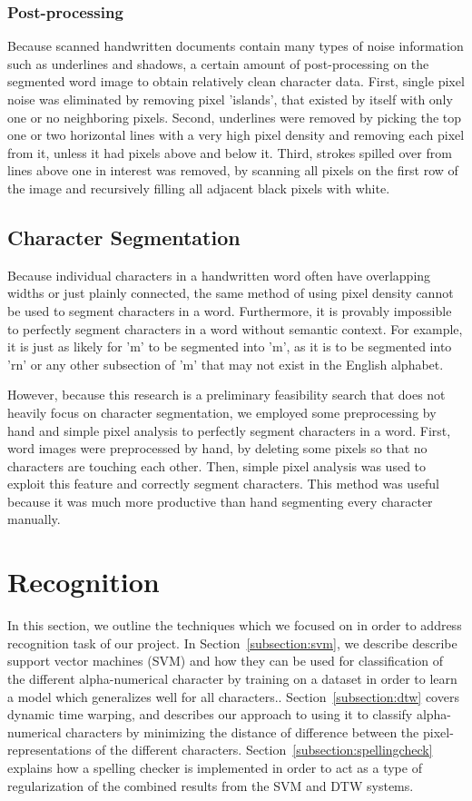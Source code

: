 \documentclass[12pt]{article}
\begin{document}
		\subsubsection{Post-processing}
		Because scanned handwritten documents contain many types of noise information such as underlines and shadows, a certain amount of post-processing on the segmented word image to obtain relatively clean character data. First, single pixel noise was eliminated by removing pixel 'islands', that existed by itself with only one or no neighboring pixels. Second, underlines were removed by picking the top one or two horizontal lines with a very high pixel density and removing each pixel from it, unless it had pixels above and below it. Third, strokes spilled over from lines above one in interest was removed, by scanning all pixels on the first row of the image and recursively filling all adjacent black pixels with white.
		

	\subsection{Character Segmentation}
		Because individual characters in a handwritten word often have overlapping widths or just plainly connected, the same method of using pixel density cannot be used to segment characters in a word. Furthermore, it is provably impossible to perfectly segment characters in a word without semantic context. For example, it is just as likely for 'm' to be segmented into 'm', as it is to be segmented into 'rn' or any other subsection of 'm' that may not exist in the English alphabet.
		
		However, because this research is a preliminary feasibility search that does not heavily focus on character segmentation, we employed some preprocessing by hand and simple pixel analysis to perfectly segment characters in a word. First, word images were preprocessed by hand, by deleting some pixels so that no characters are touching each other. Then, simple pixel analysis was used to exploit this feature and correctly segment characters. This method was useful because it was much more productive than hand segmenting every character manually.

			
\section{Recognition}
\label{section:recognition}
	In this section, we outline the techniques which we focused on in order to address recognition task of our project. In Section~\ref{subsection:svm}, we describe describe support vector machines (SVM) and how they can be used for classification of the different alpha-numerical character by training on a dataset in order to learn a model which generalizes well for all characters.. Section~\ref{subsection:dtw} covers dynamic time warping, and describes our approach to using it to classify alpha-numerical characters by minimizing the distance of difference between the pixel-representations of the different characters. Section~\ref{subsection:spellingcheck} explains how a spelling checker is implemented in order to act as a type of regularization of the combined results from the SVM and DTW systems.
\end{document}
